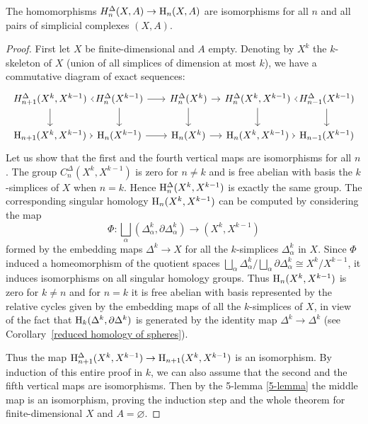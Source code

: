 \begin{thm}
    The homomorphisms $H^\Delta_n(X,A)\to \mathrm{H}_n(X,A)$ are isomorphisms for all $n$ and all pairs of simplicial complexes $(X,A)$.
\end{thm}
\begin{proof}
     First let $X$ be finite-dimensional and $A$ empty. Denoting by $X^k$ the $k$-skeleton of $X$ (union of all simplices of dimension at most $k$), we have a commutative diagram of exact sequences:
     \[\begin{tikzcd}[column sep={70, between origins}]
        H^\Delta_{n+1}(X^k,X^{k-1})\arrow[r]\arrow[d] & H^\Delta_{n}(X^{k-1})\arrow[r]\arrow[d] & H^\Delta_{n}(X^k) \arrow[r]\arrow[d] & H^\Delta_{n}(X^k,X^{k-1})\arrow[d]\arrow[r] & H^\Delta_{n-1}(X^{k-1})\arrow[d] \\
       \rmH_{n+1}(X^k,X^{k-1})\arrow[r] & \rmH_{n}(X^{k-1})\arrow[r] & \rmH_n(X^k)\arrow[r] &\rmH_n(X^k,X^{k-1}) \arrow[r] &\rmH_{n-1}(X^{k-1}) 
    \end{tikzcd}\]
    Let us show that the first and the fourth vertical maps are isomorphisms for all $n$. The group $C_n^\Delta(X^k,X^{k-1})$ is zero for $n\neq k$ and is free abelian with basis the $k$-simplices of $X$ when $n=k$. Hence $\mathrm{H}_n^\Delta(X^k,X^{k-1})$ is exactly the same group. The corresponding singular homology $\mathrm{H}_n(X^k,X^{k-1})$ can be computed by considering the map
    \[\varPhi:\bigsqcup_\alpha (\Delta_\alpha^k,\partial\Delta_\alpha^k)\to (X^k,X^{k-1})\]
    formed by the embedding maps $\Delta^k\to X$ for all the $k$-simplices $\Delta_\alpha^k$ in $X$. Since $\varPhi$ induced a homeomorphism of the quotient spaces $\bigsqcup_\alpha \Delta^k_\alpha/\bigsqcup_\alpha \partial\Delta_\alpha^k\cong X^k/X^{k-1}$, it induces isomorphisms on all singular homology groups. Thus $\mathrm{H}_n(X^k,X^{k-1})$ is zero for $k\neq n$ and for $n=k$ it is free abelian with basis represented by the relative cycles given by the embedding maps of all the $k$-simplices of $X$, in view of the fact that $\mathrm{H}_k(\Delta^k,\partial\Delta^k)$ is generated by the identity map $\Delta^k\to \Delta^k$ (see Corollary~\ref{reduced homology of spheres}).
    
    Thus the map $ \mathrm{H}_{n+1}^\Delta(X^k,X^{k-1})\to  \mathrm{H}_{n+1}(X^k,X^{k-1})$ is an isomorphism. By induction of this entire proof in $k$, we can also assume that the second and the fifth vertical maps are isomorphisms. Then by the 5-lemma \ref{5-lemma} the middle map is an isomorphism, proving the induction step and the whole theorem for finite-dimensional $X$ and $A=\varnothing$.
    

\end{proof}

